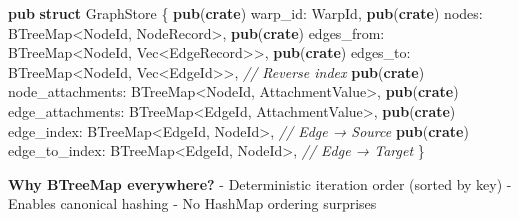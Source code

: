 \documentclass[
  11pt,
]{book}
\newenvironment{Shaded}{}{}
\newcommand{\CommentTok}[1]{\textcolor[rgb]{0.38,0.63,0.69}{\textit{#1}}}
\newcommand{\DataTypeTok}[1]{\textcolor[rgb]{0.56,0.13,0.00}{#1}}
\newcommand{\KeywordTok}[1]{\textcolor[rgb]{0.00,0.44,0.13}{\textbf{#1}}}
\newcommand{\NormalTok}[1]{#1}
\newcommand{\OperatorTok}[1]{\textcolor[rgb]{0.40,0.40,0.40}{#1}}
\begin{document}
\begin{Shaded}
\begin{Highlighting}[]
\KeywordTok{pub} \KeywordTok{struct}\NormalTok{ GraphStore }\OperatorTok{\{}
    \KeywordTok{pub}\NormalTok{(}\KeywordTok{crate}\NormalTok{) warp\_id}\OperatorTok{:}\NormalTok{ WarpId}\OperatorTok{,}
    \KeywordTok{pub}\NormalTok{(}\KeywordTok{crate}\NormalTok{) nodes}\OperatorTok{:}\NormalTok{ BTreeMap}\OperatorTok{\textless{}}\NormalTok{NodeId}\OperatorTok{,}\NormalTok{ NodeRecord}\OperatorTok{\textgreater{},}
    \KeywordTok{pub}\NormalTok{(}\KeywordTok{crate}\NormalTok{) edges\_from}\OperatorTok{:}\NormalTok{ BTreeMap}\OperatorTok{\textless{}}\NormalTok{NodeId}\OperatorTok{,} \DataTypeTok{Vec}\OperatorTok{\textless{}}\NormalTok{EdgeRecord}\OperatorTok{\textgreater{}\textgreater{},}
    \KeywordTok{pub}\NormalTok{(}\KeywordTok{crate}\NormalTok{) edges\_to}\OperatorTok{:}\NormalTok{ BTreeMap}\OperatorTok{\textless{}}\NormalTok{NodeId}\OperatorTok{,} \DataTypeTok{Vec}\OperatorTok{\textless{}}\NormalTok{EdgeId}\OperatorTok{\textgreater{}\textgreater{},}  \CommentTok{// Reverse index}
    \KeywordTok{pub}\NormalTok{(}\KeywordTok{crate}\NormalTok{) node\_attachments}\OperatorTok{:}\NormalTok{ BTreeMap}\OperatorTok{\textless{}}\NormalTok{NodeId}\OperatorTok{,}\NormalTok{ AttachmentValue}\OperatorTok{\textgreater{},}
    \KeywordTok{pub}\NormalTok{(}\KeywordTok{crate}\NormalTok{) edge\_attachments}\OperatorTok{:}\NormalTok{ BTreeMap}\OperatorTok{\textless{}}\NormalTok{EdgeId}\OperatorTok{,}\NormalTok{ AttachmentValue}\OperatorTok{\textgreater{},}
    \KeywordTok{pub}\NormalTok{(}\KeywordTok{crate}\NormalTok{) edge\_index}\OperatorTok{:}\NormalTok{ BTreeMap}\OperatorTok{\textless{}}\NormalTok{EdgeId}\OperatorTok{,}\NormalTok{ NodeId}\OperatorTok{\textgreater{},}     \CommentTok{// Edge → Source}
    \KeywordTok{pub}\NormalTok{(}\KeywordTok{crate}\NormalTok{) edge\_to\_index}\OperatorTok{:}\NormalTok{ BTreeMap}\OperatorTok{\textless{}}\NormalTok{EdgeId}\OperatorTok{,}\NormalTok{ NodeId}\OperatorTok{\textgreater{},}  \CommentTok{// Edge → Target}
\OperatorTok{\}}
\end{Highlighting}
\end{Shaded}

\textbf{Why BTreeMap everywhere?} - Deterministic iteration order
(sorted by key) - Enables canonical hashing - No HashMap ordering
surprises
\end{document}

